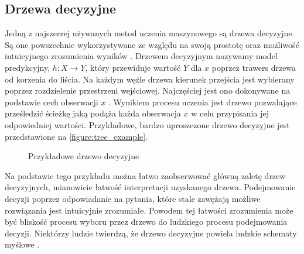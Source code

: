 \documentclass[10pt,a4paper]{article}
\begin{document}
\subsection{Drzewa decyzyjne}
\label{subsection:introduction:tree}
Jedną z najszerzej używanych metod uczenia maszynowego są drzewa decyzyjne. Są one powszechnie wykorzystywane ze względu na swoją prostotę oraz możliwość intuicyjnego zrozumienia wyników \cite{wu2008top}. Drzewem decyzyjnym nazywamy model predykcyjny, $h: X \rightarrow Y$, który przewiduje wartość $Y$ dla $x$ poprzez trawers drzewa od korzenia do liścia. Na każdym węźle drzewa kierunek przejścia jest wybierany poprzez rozdzielenie przestrzeni wejściowej. Najczęściej jest ono dokonywane na podstawie cech obserwacji $x$ \cite{books/daglib/0033642}. Wynikiem procesu uczenia jest drzewo pozwalające prześledzić ścieżkę jaką podąża każda obserwacja $x$ w celu przypisania jej odpowiedniej wartości. Przykładowe, bardzo uproszczone drzewo decyzyjne jest przedstawione na \autoref{figure:tree_example}.
\begin{figure}[!ht]
	\centering
	\caption{Przykładowe drzewo decyzyjne}
	\label{figure:tree_example}
\end{figure}
\FloatBarrier

Na podstawie tego przykładu można łatwo zaobserwować główną zaletę drzew decyzyjnych, mianowicie łatwość interpretacji uzyskanego drzewa. Podejmowanie decyzji poprzez odpowiadanie na pytania, które stale zawężają możliwe rozwiązania jest intuicyjnie zrozumiałe. Powodem tej łatwości zrozumienia może być bliskość procesu wyboru przez drzewo do ludzkiego procesu podejmowania decyzji. Niektórzy ludzie twierdzą, że drzewo decyzyjne powiela ludzkie schematy myślowe \cite{James2013}. 
\end{document}
